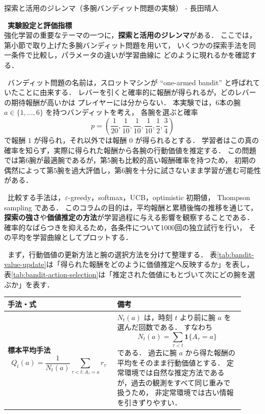 \clearpage
\begin{column}{探索と活用のジレンマ（多腕バンディット問題の実験） - 長田晴人}

\ \textbf{実験設定と評価指標}\\
強化学習の重要なテーマの一つに，\textbf{探索と活用のジレンマ}がある．
ここでは，第小節で取り上げた多腕バンディット問題を用いて，
いくつかの探索手法を同一条件で比較し，パラメータの違いが学習曲線に
どのように現れるかを確認する．

\ バンディット問題の名前は，スロットマシンが ``one-armed bandit''
と呼ばれていたことに由来する．
レバーを引くと確率的に報酬が得られるが，どのレバーの期待報酬が高いかは
プレイヤーには分からない．
本実験では，6本の腕 $a\in\{1,\ldots,6\}$ を持つバンディットを考え，
各腕を選ぶと確率
\[
    p=\left(\frac{1}{20},\frac{1}{10},\frac{1}{10},\frac{1}{10},\frac{1}{2},\frac{3}{4}\right)
\]
で報酬 $1$ が得られ，それ以外では報酬 $0$ が得られるとする．
学習者はこの真の確率を知らず，実際に得られた報酬から各腕の行動価値を推定する．
この問題では第6腕が最適腕であるが，第5腕も比較的高い報酬確率を持つため，
初期の偶然によって第5腕を過大評価し，第6腕を十分に試さないまま学習が進む可能性がある．

\ 比較する手法は，$\varepsilon$-greedy，softmax，UCB，optimistic 初期値，
Thompson sampling である．
このコラムの目的は，平均報酬と累積後悔の推移を通じて，
\textbf{探索の強さ}や\textbf{価値推定の方法}が学習過程に与える影響を観察することである．
確率的なばらつきを抑えるため，各条件について1000回の独立試行を行い，
その平均を学習曲線としてプロットする．

\ まず，行動価値の更新方法と腕の選択方法を分けて整理する．
表\ref{tab:bandit-value-update}は「得られた報酬をどのように価値推定へ反映するか」を表し，
表\ref{tab:bandit-action-selection}は「推定された価値にもとづいて次にどの腕を選ぶか」を表す．

\begin{center}
    \small
    \renewcommand{\arraystretch}{1.55}
    \label{tab:bandit-value-update}
    \begin{tabular}{p{0.42\linewidth}p{0.50\linewidth}}
      \toprule
      手法・式 & 備考 \\
      \midrule

      \textbf{標本平均手法}
      \[
      Q_t(a)
      =
      \frac{1}{N_t(a)}
      \sum_{\tau < t: A_\tau=a} r_\tau
      \]
      &
      $N_t(a)$ は，時刻 $t$ より前に腕 $a$ を選んだ回数である．
      すなわち
      \[
          N_t(a)=\sum_{\tau<t}\mathbf{1}\{A_\tau=a\}
      \]
      である．
      過去に腕 $a$ から得た報酬の平均をそのまま行動価値とする．
      定常環境では自然な推定方法であるが，過去の観測をすべて同じ重みで扱うため，
      非定常環境では古い情報を引きずりやすい．
      \\


\end{tabular}
\end{center}
\end{column}
